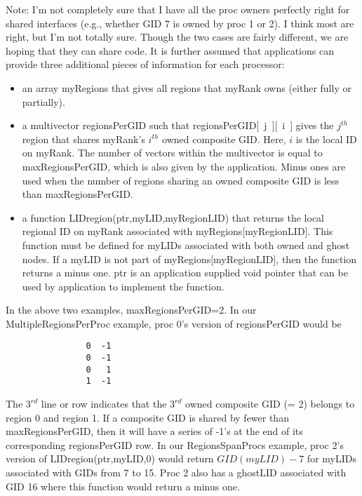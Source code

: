 \documentclass[11pt]{article}
\begin{document}
Note: I'm not completely sure that I have all the proc owners perfectly right for shared interfaces (e.g., whether GID 7 is owned by proc 1 or 2). I think most are right, but I'm not totally sure.
Though the two cases are fairly different, we are hoping that they can share code.  It is further assumed that applications can provide three additional pieces of information for each processor:
\begin{itemize}
\item an array {\sf myRegions} that gives all regions that {\sf myRank} owns (either fully or partially).
\item a multivector {\sf regionsPerGID} such that {\sf regionsPerGID[~j~][~i~]} gives the $j^{th}$ region that shares {\sf myRank}'s $i^{th}$ owned composite GID.  Here, $i$ is the local ID on {\sf myRank}.  The number of vectors within the multivector is equal to {\sf maxRegionsPerGID}, which is also given by the application. Minus ones are used when the number of regions sharing an owned
composite GID is less than {\sf maxRegionsPerGID}.
\item a function {\sf LIDregion(ptr,myLID,myRegionLID)} that returns the local regional ID on {\sf myRank} associated with {\sf myRegions[myRegionLID]}. This function must be defined for myLIDs associated with both owned and ghost nodes.
If a myLID is not part of {\sf myRegions[myRegionLID]}, then the function returns a minus one. {\sf ptr} is an application supplied void pointer that can be used by application to implement the function.
\end{itemize}

In the above two examples, {\sf maxRegionsPerGID}=2.
In our {\sf MultipleRegionsPerProc} example, proc 0's version of
{\sf regionsPerGID} would be
\vspace{-.1in}
\begin{verbatim}
                0  -1
                0  -1
                0   1
                1  -1
\end{verbatim}
\vspace{-.1in}
\noindent
The $3^{rd}$ line or row indicates that the $3^{rd}$ owned composite GID (= 2) belongs to region 0 and region 1. If a composite GID is shared by fewer than {\sf maxRegionsPerGID}, then it will have a series of -1's at the end of its corresponding {\sf regionsPerGID} row. In our {\sf RegionsSpanProcs} example, proc 2's version of  {\sf LIDregion(ptr,myLID,0)} would return $GID(myLID)-7$
for myLIDs associated with GIDs from 7 to 15. Proc 2 also has a ghostLID
associated with GID 16 where this function would return a minus one.
\end{document}
